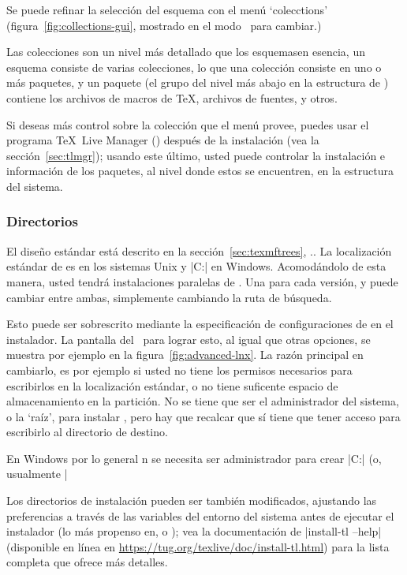 \documentclass{article}
\begin{document}
Se puede refinar la selección del esquema con el menú `colecctions'
(figura~\ref{fig:collections-gui}, mostrado en el modo \GUI\, para
cambiar.)

Las colecciones son un nivel más detallado que los esquemas\Dash en
esencia, un esquema consiste de varias colecciones, lo que una colección
consiste en uno o más paquetes, y un paquete (el grupo del nivel más
abajo en la estructura de \TL) contiene los archivos de macros de
\TeX{}, archivos de fuentes, y otros.

Si deseas más control sobre la colección que el menú provee, puedes
usar el programa \TeX\ Live Manager () después de la
instalación (vea la sección~\ref{sec:tlmgr}); usando este último,
usted puede controlar la instalación e información de los paquetes, al
nivel donde estos se encuentren, en la estructura del sistema.

\subsubsection{Directorios}
\label{sec:directories}

El diseño estándar está descrito en la sección~\ref{sec:texmftrees},
\p.\pageref{sec:texmftrees}. La localización estándar de
 es  en los sistemas
Unix y |C:\texlive{}| en Windows.  Acomodándolo de esta manera,
usted tendrá instalaciones paralelas de \TL. Una para cada versión, y puede
cambiar entre ambas, simplemente cambiando la ruta de búsqueda. 

Esto puede ser sobrescrito mediante la especificación de
configuraciones de  en el instalador. La pantalla del
\GUI\ para lograr esto, al igual que otras opciones, se muestra por
ejemplo en la figura~\ref{fig:advanced-lnx}. La razón principal en
cambiarlo, es por ejemplo si usted no tiene los permisos necesarios
para escribirlos en la localización estándar, o no tiene suficente
espacio de almacenamiento en la partición. No se tiene que ser el
administrador del sistema, o la `raíz', para instalar \TL, pero
hay que recalcar que sí tiene que tener acceso para escribirlo al
directorio de destino.

En Windows por lo general n se necesita ser administrador para crear
|C:\texlive{}| (o, usualmente |%

Los directorios de instalación pueden ser también modificados, ajustando las preferencias a través de las variables del entorno del sistema antes de ejecutar el instalador (lo más propenso en, 
 o
); vea la documentación de 
|install-tl --help| (disponible en línea en
\url{https://tug.org/texlive/doc/install-tl.html}) para la lista completa que ofrece más detalles.
\end{document}
